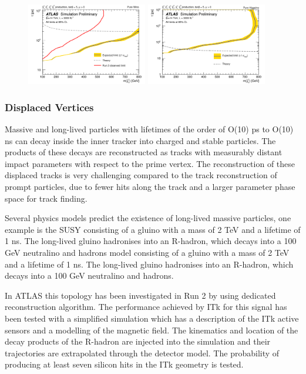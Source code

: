 \begin{figure}[hbtp]\begin{center}
\includegraphics[width=0.47\textwidth]{figures/ch03_fig_040a.png}
\includegraphics[width=0.47\textwidth]{figures/ch03_fig_040b.png}
\caption{ }
\label{fig:ATLAS_DT2}
\end{center}
\end{figure}


\subsubsection{Displaced Vertices} 

Massive and long-lived particles with lifetimes of the order of O(10) ps to O(10) ns can decay inside
the inner tracker into charged and stable particles. 
The products of these decays are reconstructed as tracks with measurably distant impact parameters with respect to the prime vertex.
The reconstruction of these displaced tracks is very challenging compared to the track reconstruction of prompt particles, due to fewer hits along the track and
a larger parameter phase space for track finding.

Several physics models predict the existence of long-lived massive particles, one example is the SUSY consisting of a gluino with a mass of 2 TeV and a
lifetime of 1 ns. The long-lived gluino hadronises into an R-hadron, which decays into a
100 GeV neutralino and hadrons model consisting of a gluino with a mass of 2 TeV and a
lifetime of 1 ns. The long-lived gluino hadronises into an R-hadron, which decays into a
100 GeV neutralino and hadrons.

 In ATLAS this topology has been investigated in Run 2 by using dedicated reconstruction algorithm.
The performance achieved by ITk for this signal has been tested  with
a simplified simulation which has a description of the ITk active sensors and a modelling
of the magnetic field. 
The kinematics and location of the decay products of the R-hadron
are injected into the simulation and their trajectories are extrapolated through the detector model. 
The probability of producing at least seven silicon hits in the ITk geometry is tested. 


